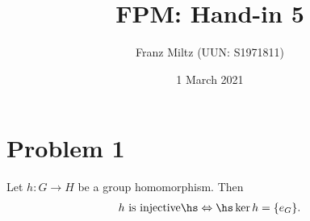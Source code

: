 \documentclass{article}
\begin{document}
\title{FPM: Hand-in 5}
\author{Franz Miltz (UUN: S1971811)}
\date{1 March 2021}
\maketitle
\mkthms

\section*{Problem 1}

\begin{claim*}
    Let $h:G\to H$ be a group homomorphism. Then
    \begin{align}
        \label{iff}
        h\text{ is injective}\hs\Leftrightarrow\hs \ker h = \{e_G\}.
    \end{align}
\end{claim*}
\end{document}

